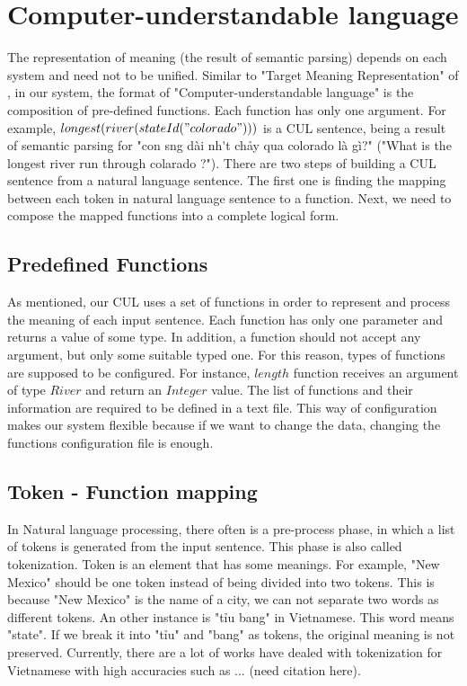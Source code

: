 \section{Computer-understandable language}
\label{sec:c-u}

The representation of meaning (the result of semantic parsing) depends on each system and need not to be unified. Similar to "Target Meaning Representation" of \cite{Clarke:2010:DSP:1870568.1870571}, in our system, the format of "Computer-understandable language" is the composition of pre-defined functions. Each function has only one argument. For example, $longest(river(stateId("colorado")))$ is a CUL sentence, being a result of semantic parsing for
"{\selectfont con s\ocircumflex ng d\`ai nh\'\acircumflex t ch\h{a}y qua colorado l\`a g\`i?}" ("What is the longest river run through colarado ?"). There are two steps of building a CUL sentence from a natural language sentence. The first one is finding the mapping between each token in natural language sentence to a function. Next, we need to compose the mapped functions into a complete logical form.

\subsection{Predefined Functions}
As mentioned, our CUL uses a set of functions in order to represent and process the meaning of each input sentence. Each function has only one parameter and returns a value of some type. In addition, a function should not accept any argument, but only some suitable typed one. For this reason, types of functions are supposed to be configured. For instance, $length$ function receives an argument of type $River$ and return an $Integer$ value. The list of functions and their information are required to be defined in a text file. This way of configuration makes our system flexible because if we want to change the data, changing the functions configuration file is enough.

\subsection{Token - Function mapping}
In Natural language processing, there often is a pre-process phase, in which a list of tokens is generated from the input sentence. This phase is also called tokenization. Token is an element that has some meanings. For example, "New Mexico" should be one token instead of being divided into two tokens. This is because "New Mexico" is the name of a city, we can not separate two words as different tokens. An other instance is "{\selectfont ti\h\ecircumflex u bang}" in Vietnamese. This word means "state". If we break it into "{\selectfont ti\h\ecircumflex u}" and "bang" as tokens, the original meaning is not preserved. Currently, there are a lot of works have dealed with tokenization for Vietnamese with high accuracies such as ... (need citation here).


